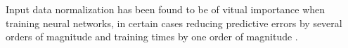 Input data normalization has been found to be of vitual importance when training neural networks, in certain cases reducing predictive errors by several orders of magnitude and training times by one order of magnitude \cite{input_normalization_1997}.

